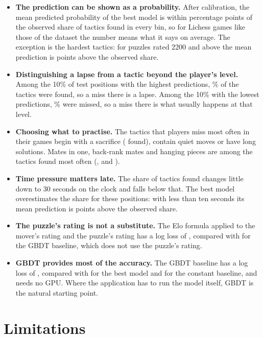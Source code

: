 \documentclass[11pt]{article}
\begin{document}
\begin{itemize}
\item \textbf{The prediction can be shown as a probability.} After
calibration, the mean predicted probability of the best model is within
 percentage points of the observed share of
tactics found in every bin, so for Lichess games like those of the dataset
the number means what it says on average.\iflook{} The exception is the
hardest tactics: for puzzles rated 2200 and above the mean prediction is
 points above the observed
share.\fi
\iflook
\item \textbf{Distinguishing a lapse from a tactic beyond the player's
level.} Among the 10\% of test positions with the highest predictions,
\% of the tactics were found, so a miss there is a
lapse. Among the 10\% with the lowest predictions, \%
were missed, so a miss there is what usually happens at that level.
\item \textbf{Choosing what to practise.} The tactics that players miss most
often in their games begin with a sacrifice
( found), contain quiet moves or have long
solutions. Mates in one, back-rank mates and hanging pieces are among the
tactics found most often (,
 and
).
\item \textbf{Time pressure matters late.} The share of tactics found
changes little down to 30 seconds on the clock and falls below that. The
best model overestimates the share for these positions: with less than ten
seconds its mean prediction is  points
above the observed share.
\item \textbf{The puzzle's rating is not a substitute.} The Elo formula
applied to the mover's rating and the puzzle's rating has a log loss of
, compared with  for the GBDT
baseline, which does not use the puzzle's rating.
\fi
\item \textbf{GBDT provides most of the accuracy.} The GBDT baseline has a
log loss of , compared with  for the best
model and  for the constant baseline, and needs no GPU. Where
the application has to run the model itself, GBDT is the natural starting
point.
\end{itemize}

\section{Limitations}
\label{sec:limits}
\end{document}

